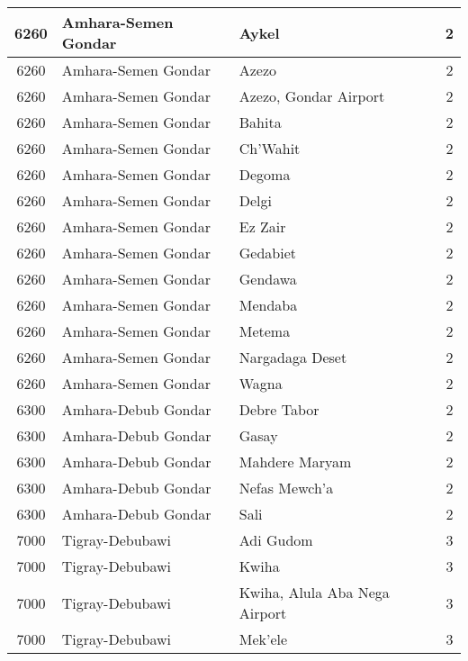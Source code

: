 \documentclass[12pt,a4paper]{report}
\begin{document}
\begin{tabular}{|c|l|l|c|}
\hline 
\rule[-1ex]{0pt}{2.5ex} 6260 & Amhara-Semen Gondar & Aykel & 2 \\
\hline 
\rule[-1ex]{0pt}{2.5ex} 6260 & Amhara-Semen Gondar & Azezo & 2 \\
\hline 
\rule[-1ex]{0pt}{2.5ex} 6260 & Amhara-Semen Gondar & Azezo, Gondar Airport & 2 \\
\hline 
\rule[-1ex]{0pt}{2.5ex} 6260 & Amhara-Semen Gondar & Bahita & 2 \\
\hline 
\rule[-1ex]{0pt}{2.5ex} 6260 & Amhara-Semen Gondar & Ch'Wahit & 2 \\
\hline 
\rule[-1ex]{0pt}{2.5ex} 6260 & Amhara-Semen Gondar & Degoma & 2 \\
\hline 
\rule[-1ex]{0pt}{2.5ex} 6260 & Amhara-Semen Gondar & Delgi & 2 \\
\hline 
\rule[-1ex]{0pt}{2.5ex} 6260 & Amhara-Semen Gondar & Ez Zair & 2 \\
\hline 
\rule[-1ex]{0pt}{2.5ex} 6260 & Amhara-Semen Gondar & Gedabiet & 2 \\
\hline 
\rule[-1ex]{0pt}{2.5ex} 6260 & Amhara-Semen Gondar & Gendawa & 2 \\
\hline 
\rule[-1ex]{0pt}{2.5ex} 6260 & Amhara-Semen Gondar & Mendaba & 2 \\
\hline 
\rule[-1ex]{0pt}{2.5ex} 6260 & Amhara-Semen Gondar & Metema & 2 \\
\hline 
\rule[-1ex]{0pt}{2.5ex} 6260 & Amhara-Semen Gondar & Nargadaga Deset & 2 \\
\hline 
\rule[-1ex]{0pt}{2.5ex} 6260 & Amhara-Semen Gondar & Wagna & 2 \\
\hline 
\rule[-1ex]{0pt}{2.5ex} 6300 & Amhara-Debub Gondar & Debre Tabor & 2 \\
\hline 
\rule[-1ex]{0pt}{2.5ex} 6300 & Amhara-Debub Gondar & Gasay & 2 \\
\hline 
\rule[-1ex]{0pt}{2.5ex} 6300 & Amhara-Debub Gondar & Mahdere Maryam & 2 \\
\hline 
\rule[-1ex]{0pt}{2.5ex} 6300 & Amhara-Debub Gondar & Nefas Mewch'a & 2 \\
\hline 
\rule[-1ex]{0pt}{2.5ex} 6300 & Amhara-Debub Gondar & Sali & 2 \\
\hline 
\rule[-1ex]{0pt}{2.5ex} 7000 & Tigray-Debubawi & Adi Gudom & 3 \\
\hline 
\rule[-1ex]{0pt}{2.5ex} 7000 & Tigray-Debubawi & Kwiha & 3 \\
\hline 
\rule[-1ex]{0pt}{2.5ex} 7000 & Tigray-Debubawi & Kwiha, Alula Aba Nega Airport & 3 \\
\hline 
\rule[-1ex]{0pt}{2.5ex} 7000 & Tigray-Debubawi & Mek'ele & 3 \\

\end{tabular}
\end{document}
